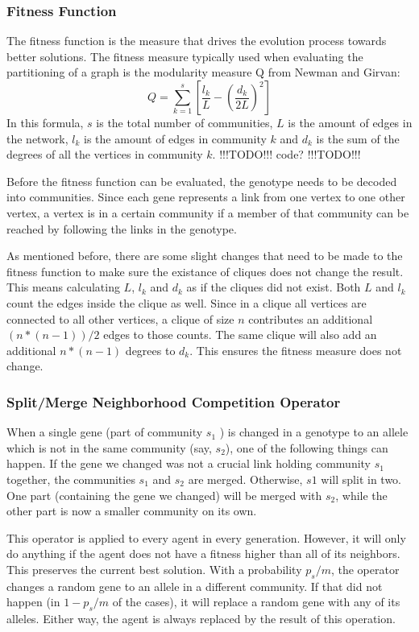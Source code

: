 \subsubsection{Fitness Function}
The fitness function is the measure that drives the evolution process towards better solutions. The fitness measure typically used when evaluating the partitioning of a graph is the modularity measure Q from Newman and Girvan\cite{Newman2004}:
\begin{equation}
Q = \sum_{k=1}^{s} \left[ \frac{l_{k}}{L} - \left( \frac{d_{k}}{2L} \right)^{2} \right]
\end{equation}
In this formula, $s$ is the total number of communities, $L$ is the amount of edges in the network, $l_{k}$ is the amount of edges in community $k$ and $d_{k}$ is the sum of the degrees of all the vertices in community $k$. !!!TODO!!! code? !!!TODO!!!
\par
Before the fitness function can be evaluated, the genotype needs to be decoded into communities. Since each gene represents a link from one vertex to one other vertex, a vertex is in a certain community if a member of that community can be reached by following the links in the genotype.
\par
As mentioned before, there are some slight changes that need to be made to the fitness function to make sure the existance of cliques does not change the result. This means calculating $L$, $l_{k}$ and $d_{k}$ as if the cliques did not exist. Both $L$ and $l_{k}$ count the edges inside the clique as well. Since in a clique all vertices are connected to all other vertices, a clique of size $n$ contributes an additional $ (n * (n - 1))/2 $ edges to those counts. The same clique will also add an additional $n * (n - 1)$ degrees to $d_{k}$. This ensures the fitness measure does not change.
\subsubsection{Split/Merge Neighborhood Competition Operator}
When a single gene (part of community $s_1$ ) is changed in a genotype to an allele which is not in the same community (say, $s_2$), one of the following things can happen. If the gene we changed was not a crucial link holding community $s_1$ together, the communities $s_1$ and $s_2$ are merged. Otherwise, $s1$ will split in two. One part (containing the gene we changed) will be merged with $s_2$, while the other part is now a smaller community on its own.
\par
This operator is applied to every agent in every generation. However, it will only do anything if the agent does not have a fitness higher than all of its neighbors. This preserves the current best solution. With a probability $p_s/m$, the operator changes a random gene to an allele in a different community. If that did not happen (in $1 - p_s/m$ of the cases), it will replace a random gene with any of its alleles. Either way, the agent is always replaced by the result of this operation.
